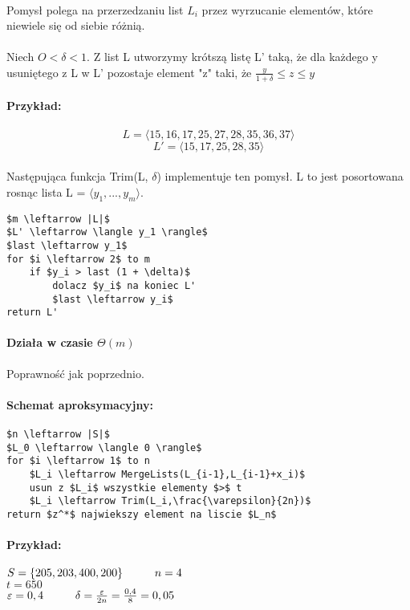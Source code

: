 \paragraph{}{Pomysł polega na przerzedzaniu list $L_i$ przez wyrzucanie elementów, które niewiele się od siebie różnią.}
\paragraph{}{Niech $O<\delta <1$. Z list L utworzymy krótszą listę L' taką, że dla każdego y usuniętego z L w L' pozostaje element "z" taki, że $\frac{y}{1+\delta}\leq z\leq y$ }
\paragraph{Przykład:\\}{$$L = \langle 15, 16, 17, 25, 27, 28, 35, 36, 37 \rangle $$ 
$$L' = \langle 15, 17, 25, 28, 35 \rangle $$}
\paragraph{}{Następująca funkcja  Trim(L, $\delta$) implementuje ten pomysł. L to jest posortowana rosnąc lista L = $\langle y_1, ..., y_m \rangle$.}
\begin{lstlisting}[caption={Trim(L,$\delta$)}]
$m \leftarrow |L|$
$L' \leftarrow \langle y_1 \rangle$
$last \leftarrow y_1$
for $i \leftarrow 2$ to m
	if $y_i > last (1 + \delta)$
		dolacz $y_i$ na koniec L'
		$last \leftarrow y_i$
return L'
\end{lstlisting}

\paragraph{Działa w czasie $\Theta(m)$}{Poprawność jak poprzednio.}
\paragraph{Schemat aproksymacyjny:}
\begin{lstlisting}[caption={ApproxSubsetSum(S,t,$\varepsilon$)}]
$n \leftarrow |S|$
$L_0 \leftarrow \langle 0 \rangle$
for $i \leftarrow 1$ to n
	$L_i \leftarrow MergeLists(L_{i-1},L_{i-1}+x_i)$
	usun z $L_i$ wszystkie elementy $>$ t
	$L_i \leftarrow Trim(L_i,\frac{\varepsilon}{2n})$
return $z^*$ najwiekszy element na liscie $L_n$
\end{lstlisting}
\paragraph{Przykład:}{$S=\lbrace 205, 203, 400, 200\rbrace \hspace*{1cm} n=4$ \\ $t=650$ \\ $\varepsilon = 0,4 \hspace*{1cm} \delta=\frac{\varepsilon}{2n}=\frac{0,4}{8}=0,05$}

